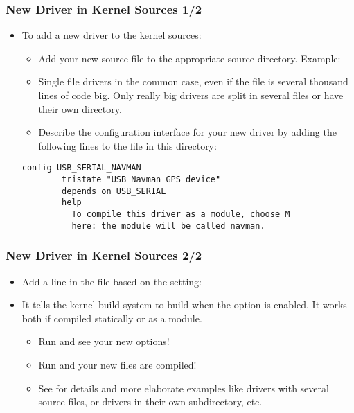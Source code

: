 \begin{frame}[fragile]
  \frametitle{New Driver in Kernel Sources 1/2}
  \begin{itemize}
  \item To add a new driver to the kernel sources:
    \begin{itemize}
    \item Add your new source file to the appropriate source
      directory. Example: 
    \item Single file drivers in the common case, even if the file is
      several thousand lines of code big. Only really big drivers are
      split in several files or have their own directory.
    \item Describe the configuration interface for your new driver by
      adding the following lines to the  file in this
      directory:
    \end{itemize}
{\footnotesize
\begin{block}{}
\begin{verbatim}
config USB_SERIAL_NAVMAN
        tristate "USB Navman GPS device"
        depends on USB_SERIAL
        help
          To compile this driver as a module, choose M
          here: the module will be called navman.
\end{verbatim}
\end{block}
}
  \end{itemize}
\end{frame}

\begin{frame}
  \frametitle{New Driver in Kernel Sources 2/2}
  \begin{itemize}
  \item Add a line in the  file based on the
 setting:
  \item It tells the kernel build system to build  when the
     option is enabled. It works both if
    compiled statically or as a module.
    \begin{itemize}
    \item Run  and see your new options!
    \item Run  and your new files are compiled!
    \item See  for details and more
      elaborate examples like drivers with several source files, or
      drivers in their own subdirectory, etc.
    \end{itemize}
  \end{itemize}
\end{frame}

